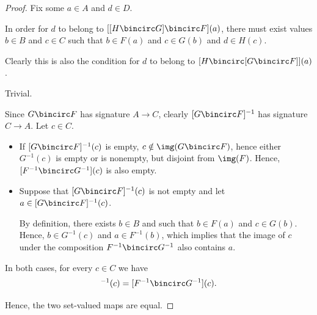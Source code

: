 \begin{proof}
   Fix some \( a \in A \) and \( d \in D \).

  In order for \( d \) to belong to \( [[H \bincirc G] \bincirc F](a) \), there must exist values \( b \in B \) and \( c \in C \) such that \( b \in F(a) \) and \( c \in G(b) \) and \( d \in H(c) \).

  Clearly this is also the condition for \( d \) to belong to \( [H \bincirc [G \bincirc F]](a) \).

   Trivial.

   Since \( G \bincirc F \) has signature \( A \to C \), clearly \( [G \bincirc F]^{-1} \) has signature \( C \to A \). Let \( c \in C \).

  \begin{itemize}
    \item If \( [G \bincirc F]^{-1}(c) \) is empty, \( c \notin \img(G \bincirc F) \), hence either \( G^{-1}(c) \) is empty or is nonempty, but disjoint from \( \img(F) \). Hence, \( [F^{-1} \bincirc G^{-1}](c) \) is also empty.

    \item Suppose that \( [G \bincirc F]^{-1}(c) \) is not empty and let \( a \in [G \bincirc F]^{-1}(c) \).

    By definition, there exists \( b \in B \) and such that \( b \in F(a) \) and \( c \in G(b) \). Hence, \( b \in G^{-1}(c) \) and \( a \in F^{-1}(b) \), which implies that the image of \( c \) under the composition \( F^{-1} \bincirc G^{-1} \) also contains \( a \).
  \end{itemize}

  In both cases, for every \( c \in C \) we have
  \begin{equation*}
    [G \bincirc F]^{-1}(c) = [F^{-1} \bincirc G^{-1}](c).
  \end{equation*}

  Hence, the two set-valued maps are equal.
\end{proof}

